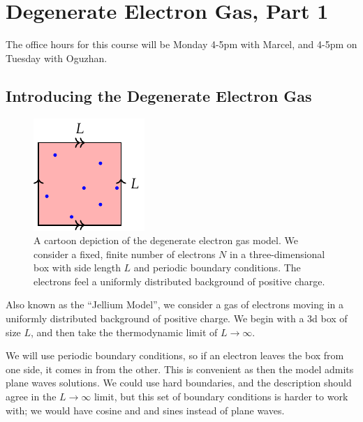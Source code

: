 \section{Degenerate Electron Gas, Part 1}
The office hours for this course will be Monday 4-5pm with Marcel, and 4-5pm on Tuesday with Oguzhan.

\subsection{Introducing the Degenerate Electron Gas}
\begin{figure}[htbp]
    \centering
    \includegraphics[]{Images/fig-jelliumcartoon.pdf}
    
    \caption{A cartoon depiction of the degenerate electron gas model. We consider a fixed, finite number of electrons $N$ in a three-dimensional box with side length $L$ and periodic boundary conditions. The electrons feel a uniformly distributed background of positive charge.}
    \label{fig-jelliumcartoon}
\end{figure}
Also known as the ``Jellium Model'', we consider a gas of electrons moving in a uniformly distributed background of positive charge. We begin with a 3d box of size $L$, and then take the thermodynamic limit of $L \to \infty$. 

We will use periodic boundary conditions, so if an electron leaves the box from one side, it comes in from the other. This is convenient as then the model admits plane waves solutions. We could use hard boundaries, and the description should agree in the $L \to \infty$ limit, but this set of boundary conditions is harder to work with; we would have cosine and and sines instead of plane waves.

